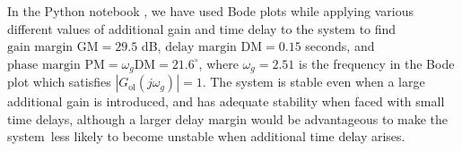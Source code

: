 \documentclass[9pt,a4paper]{article}
\begin{document}
    In the Python notebook \cite{python_notebook}, we have used Bode plots while applying various different values of additional gain and time delay to the system to find $\text{gain margin GM} = 29.5$ dB, $\text{delay margin DM} = 0.15$ seconds, and $\text{phase margin PM} = \omega_g\text{DM}=21.6^\circ$, where $\omega_g=2.51$ is the frequency in the Bode plot which satisfies $|G_{\text{ol}}(j\omega_g)|=1$. The system is stable even when a large additional gain is introduced, and has adequate stability when faced with small time delays, although a larger delay margin would be advantageous to make the system less likely to become unstable when additional time delay arises.

    \thispagestyle{empty}

    
    
\end{document}
